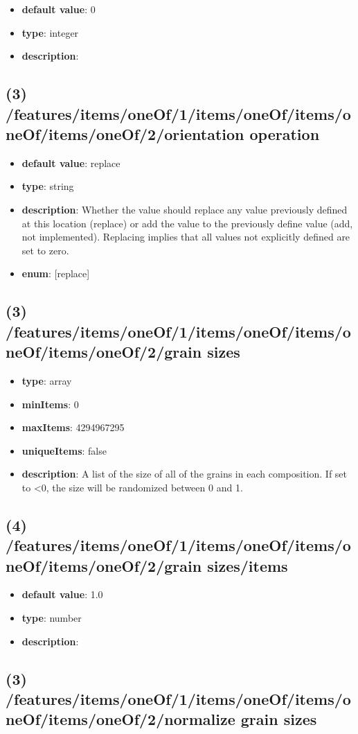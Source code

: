 \begin{itemize}[leftmargin=4em]\item {\bf default value}: 0
\item {\bf type}: integer
\item {\bf description}: 
\end{itemize}\subsection{(3) /features/items/oneOf/1/items/oneOf/items/oneOf/items/oneOf/2/orientation operation}
\begin{itemize}[leftmargin=3em]\item {\bf default value}: replace
\item {\bf type}: string
\item {\bf description}: Whether the value should replace any value previously defined at this location (replace) or add the value to the previously define value (add, not implemented). Replacing implies that all values not explicitly defined are set to zero.
\item {\bf enum}: [replace]\end{itemize}\subsection{(3) /features/items/oneOf/1/items/oneOf/items/oneOf/items/oneOf/2/grain sizes}
\begin{itemize}[leftmargin=3em]\item {\bf type}: array
\item {\bf minItems}: 0
\item {\bf maxItems}: 4294967295
\item {\bf uniqueItems}: false
\item {\bf description}: A list of the size of all of the grains in each composition. If set to <0, the size will be randomized between 0 and 1.
\end{itemize}\subsection{(4) /features/items/oneOf/1/items/oneOf/items/oneOf/items/oneOf/2/grain sizes/items}
\begin{itemize}[leftmargin=4em]\item {\bf default value}: 1.0
\item {\bf type}: number
\item {\bf description}: 
\end{itemize}\subsection{(3) /features/items/oneOf/1/items/oneOf/items/oneOf/items/oneOf/2/normalize grain sizes}
